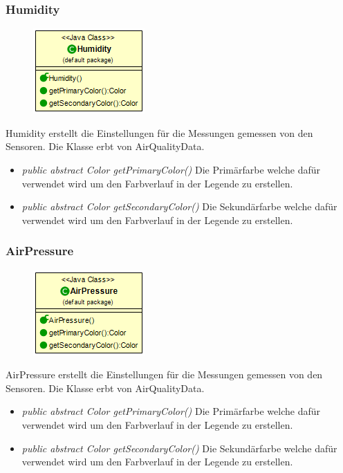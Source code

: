 \subsubsection{Humidity}
\begin{minipage}{0.3\textwidth}
    \begin{figure}[H]
        \includegraphics[scale = 0.5
        ]{media/view/airquality/Humidity_Class.png}
    \end{figure}
    \end{minipage} \hfill
    \begin{minipage}{0.6\textwidth}
Humidity erstellt die Einstellungen für die Messungen gemessen von den Sensoren. Die Klasse erbt von AirQualityData.
\end{minipage}
\begin{itemize} [noitemsep]
	\item \emph{public abstract Color getPrimaryColor()} Die Primärfarbe welche dafür verwendet wird um den Farbverlauf in der Legende zu erstellen.
	\item \emph{public abstract Color getSecondaryColor()} Die Sekundärfarbe welche dafür verwendet wird um den Farbverlauf in der Legende zu erstellen.
\end{itemize}

\subsubsection{AirPressure}
\begin{minipage}{0.3\textwidth}
    \begin{figure}[H]
        \includegraphics[scale = 0.5
        ]{media/view/airquality/AirPressure_Class.png}
    \end{figure}
    \end{minipage} \hfill
    \begin{minipage}{0.6\textwidth}
AirPressure erstellt die Einstellungen für die Messungen gemessen von den Sensoren. Die Klasse erbt von AirQualityData.
\end{minipage}
\begin{itemize} [noitemsep]
    \item \emph{public abstract Color getPrimaryColor()} Die Primärfarbe welche dafür verwendet wird um den Farbverlauf in der Legende zu erstellen.
    \item \emph{public abstract Color getSecondaryColor()} Die Sekundärfarbe welche dafür verwendet wird um den Farbverlauf in der Legende zu erstellen.
\end{itemize}


